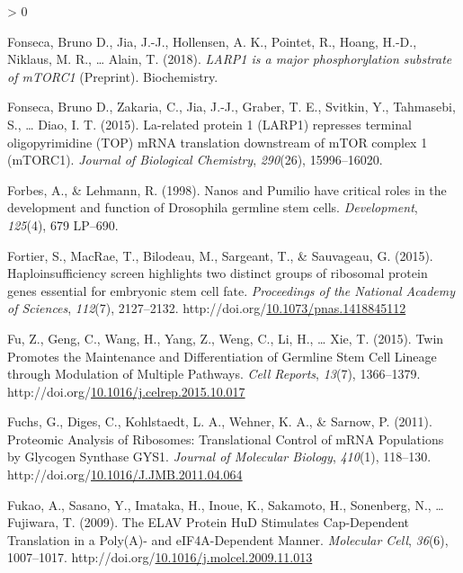 \documentclass[12pt,oneside]{reedthesis}
\newlength{\cslhangindent}
\newenvironment{CSLReferences}[2] %
 {%
  \setlength{\parindent}{0pt}
  \ifodd #1 \everypar{\setlength{\hangindent}{\cslhangindent}}\ignorespaces\fi
  \ifnum #2 > 0
  \setlength{\parskip}{#2\baselineskip}
  \fi
 }%
 {}
\begin{document}
\begin{CSLReferences}{1}{0}
\leavevmode\hypertarget{ref-fonsecaLARP1MajorPhosphorylation2018}{}%
Fonseca, Bruno D., Jia, J.-J., Hollensen, A. K., Pointet, R., Hoang, H.-D., Niklaus, M. R., \ldots{} Alain, T. (2018). \emph{{LARP1} is a major phosphorylation substrate of {mTORC1}} (Preprint). {Biochemistry}.

\leavevmode\hypertarget{ref-Fonseca2015a}{}%
Fonseca, Bruno D., Zakaria, C., Jia, J.-J., Graber, T. E., Svitkin, Y., Tahmasebi, S., \ldots{} Diao, I. T. (2015). La-related protein 1 ({LARP1}) represses terminal oligopyrimidine ({TOP}) {mRNA} translation downstream of {mTOR} complex 1 ({mTORC1}). \emph{Journal of Biological Chemistry}, \emph{290}(26), 15996--16020.

\leavevmode\hypertarget{ref-Forbes1998g}{}%
Forbes, A., \& Lehmann, R. (1998). Nanos and {Pumilio} have critical roles in the development and function of {Drosophila} germline stem cells. \emph{Development}, \emph{125}(4), 679 LP--690.

\leavevmode\hypertarget{ref-fortierHaploinsufficiencyScreenHighlights2015}{}%
Fortier, S., MacRae, T., Bilodeau, M., Sargeant, T., \& Sauvageau, G. (2015). Haploinsufficiency screen highlights two distinct groups of ribosomal protein genes essential for embryonic stem cell fate. \emph{Proceedings of the National Academy of Sciences}, \emph{112}(7), 2127--2132. http://doi.org/\href{https://doi.org/10.1073/pnas.1418845112}{10.1073/pnas.1418845112}

\leavevmode\hypertarget{ref-Fu2015h}{}%
Fu, Z., Geng, C., Wang, H., Yang, Z., Weng, C., Li, H., \ldots{} Xie, T. (2015). Twin {Promotes} the {Maintenance} and {Differentiation} of {Germline Stem Cell Lineage} through {Modulation} of {Multiple Pathways}. \emph{Cell Reports}, \emph{13}(7), 1366--1379. http://doi.org/\href{https://doi.org/10.1016/j.celrep.2015.10.017}{10.1016/j.celrep.2015.10.017}

\leavevmode\hypertarget{ref-fuchsProteomicAnalysisRibosomes2011}{}%
Fuchs, G., Diges, C., Kohlstaedt, L. A., Wehner, K. A., \& Sarnow, P. (2011). Proteomic {Analysis} of {Ribosomes}: {Translational Control} of {mRNA Populations} by {Glycogen Synthase GYS1}. \emph{Journal of Molecular Biology}, \emph{410}(1), 118--130. http://doi.org/\href{https://doi.org/10.1016/J.JMB.2011.04.064}{10.1016/J.JMB.2011.04.064}

\leavevmode\hypertarget{ref-Fukao2009c}{}%
Fukao, A., Sasano, Y., Imataka, H., Inoue, K., Sakamoto, H., Sonenberg, N., \ldots{} Fujiwara, T. (2009). The {ELAV Protein HuD Stimulates Cap}-{Dependent Translation} in a {Poly}({A})- and {eIF4A}-{Dependent Manner}. \emph{Molecular Cell}, \emph{36}(6), 1007--1017. http://doi.org/\href{https://doi.org/10.1016/j.molcel.2009.11.013}{10.1016/j.molcel.2009.11.013}


\end{CSLReferences}
\end{document}
